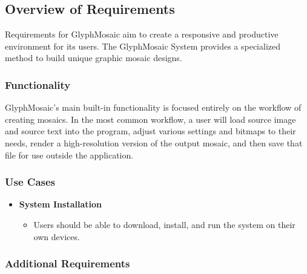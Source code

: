 \documentclass{article}
\newcommand{\sidiagram}[4]{
  \begin{figure}[H]
    \centering
    \adjustbox{scale=#4}{
    \texttt{[image: 
          \{\#1]}
        }}
    \caption{{#2}}
    \label{{#3}}
  \end{figure}
}
\newcommand{\lbodyitem}[2]{
    \item \textbf{{#1}} {
    \begin{itemize}
    #2
    \end{itemize}
  }
}
\begin{document}
\subsection{Overview of Requirements}
Requirements for GlyphMosaic aim to create a responsive and productive environment for its users.
The GlyphMosaic System provides a specialized method to build unique graphic mosaic designs.


\subsubsection{Functionality}
GlyphMosaic’s main built-in functionality is focused entirely on the workflow of creating mosaics.
In the most common workflow, a user will load source image and source text into the program, adjust various settings and bitmaps to their needs, render a high-resolution version of the output mosaic, and then save that file for use outside the application.


\subsubsection{Use Cases}
\label{sec:usecases}

\begin{itemize}
  \lbodyitem{System Installation}{
  \item Users should be able to download, install, and run the system on their own devices.
        }
\end{itemize}

\subsubsection{Additional Requirements}

\end{document}
